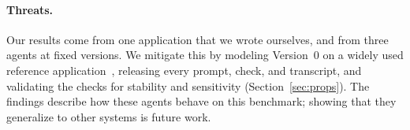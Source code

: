 \paragraph{Threats.}
Our results come from one application that we wrote ourselves, and from three agents at fixed
versions. We mitigate this by modeling Version~0 on a widely used reference
application~\cite{onlineboutique}, releasing every prompt, check, and transcript, and validating
the checks for stability and sensitivity (Section~\ref{sec:props}). The findings describe how these
agents behave on this benchmark; showing that they generalize to other systems is future work.
